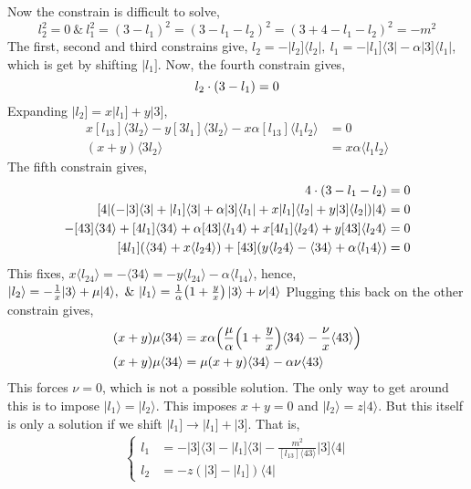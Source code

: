 Now the constrain is difficult to solve,
\[l_2^2=0\ \&\ l^2_1=(3-l_1)^2=(3-l_1-l_2)^2=(3+4-l_1-l_2)^2=-m^2\]
The first, second and third constrains give, $l_2=-|l_2]\langle l_2|,\ l_1=-|l_1]\langle 3|-\alpha|3]\langle l_1|$, which is get by shifting $|l_1]$. 
Now, the fourth constrain gives,
\[l_2\cdot \qty(3-l_1)=0\]
Expanding $|l_2]=x|l_1]+y|3]$,
\begin{align*}
    x[l_13]\langle 3l_2\rangle-y[3l_1]\langle 3l_2\rangle - x\alpha[l_13]\langle l_1l_2\rangle&=0\\
    (x+y)\langle 3l_2\rangle &= x\alpha\langle l_1l_2\rangle
\end{align*}
The fifth constrain gives,
\begin{align*}
    4\cdot \qty(3-l_1-l_2)&=0\\
    [4|(-|3]\langle3|+|l_1]\langle 3|+\alpha|3]\langle l_1|+x|l_1]\langle l_2|+y|3]\langle l_2|)|4\rangle&=0\\
    -[43]\langle34\rangle+[4l_1]\langle 34\rangle+\alpha[43]\langle l_14\rangle+x[4l_1]\langle l_24\rangle+y[43]\langle l_24\rangle&=0\\
    [4l_1](\langle 34\rangle+x\langle l_24\rangle)+[43](y\langle l_24\rangle-\langle34\rangle+\alpha\langle l_14\rangle)&=0
\end{align*}
This fixes, $x\langle l_24\rangle=-\langle34\rangle=-y\langle l_24\rangle-\alpha\langle l_14\rangle$, hence, $|l_2\rangle = -\frac1x|3\rangle+\mu|4\rangle,\ \&\ |l_1\rangle = \frac1\alpha\qty(1+\frac yx)|3\rangle+\nu|4\rangle$ 
Plugging this back on the other constrain gives,
\begin{align*}
    (x+y)\mu\langle34\rangle&=x\alpha\qty(\frac\mu\alpha\qty(1+\frac yx)\langle34\rangle-\frac \nu x\langle43\rangle)\\
    (x+y)\mu\langle34\rangle&=\mu\qty(x+y)\langle34\rangle-\alpha\nu \langle43\rangle
\end{align*}
This forces $\nu=0$, which is not a possible solution. The only way to get around this is to impose $|l_1\rangle=|l_2\rangle$. This imposes $x+y=0$ and 
$|l_2\rangle=z|4\rangle$. But this itself is only a solution if we shift $|l_1]\rightarrow|l_1]+|3]$. That is,
\begin{align*}
    \begin{cases}
        l_1&=-|3]\langle3|-|l_1]\langle3|-\frac{m^2}{[l_13]\langle 43\rangle}|3]\langle 4|\\
        l_2&=-z(|3]-|l_1])\langle4|
    \end{cases}
\end{align*}